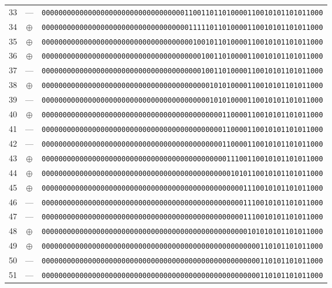 \documentclass[11pt,a4paper]{article}
\begin{document}
\begin{center}
\begin{tabular}{rcl}
    33 & --- & \texttt{0000000000000000000000000000000000110011011010000110010101101011000} \\
    34 & $\oplus$ & \texttt{0000000000000000000000000000000000011111011010000110010101101011000} \\
    35 & $\oplus$ & \texttt{0000000000000000000000000000000000001001011010000110010101101011000} \\
    36 & $\oplus$ & \texttt{0000000000000000000000000000000000000010011010000110010101101011000} \\
    37 & --- & \texttt{0000000000000000000000000000000000000010011010000110010101101011000} \\
    38 & $\oplus$ & \texttt{0000000000000000000000000000000000000000101010000110010101101011000} \\
    39 & --- & \texttt{0000000000000000000000000000000000000000101010000110010101101011000} \\
    40 & $\oplus$ & \texttt{0000000000000000000000000000000000000000000110000110010101101011000} \\
    41 & --- & \texttt{0000000000000000000000000000000000000000000110000110010101101011000} \\
    42 & --- & \texttt{0000000000000000000000000000000000000000000110000110010101101011000} \\
    43 & $\oplus$ & \texttt{0000000000000000000000000000000000000000000011100110010101101011000} \\
    44 & $\oplus$ & \texttt{0000000000000000000000000000000000000000000001010110010101101011000} \\
    45 & $\oplus$ & \texttt{0000000000000000000000000000000000000000000000001110010101101011000} \\
    46 & --- & \texttt{0000000000000000000000000000000000000000000000001110010101101011000} \\
    47 & --- & \texttt{0000000000000000000000000000000000000000000000001110010101101011000} \\
    48 & $\oplus$ & \texttt{0000000000000000000000000000000000000000000000000101010101101011000} \\
    49 & $\oplus$ & \texttt{0000000000000000000000000000000000000000000000000000110101101011000} \\
    50 & --- & \texttt{0000000000000000000000000000000000000000000000000000110101101011000} \\
    51 & --- & \texttt{0000000000000000000000000000000000000000000000000000110101101011000} \\

\end{tabular}
\end{center}
\end{document}
